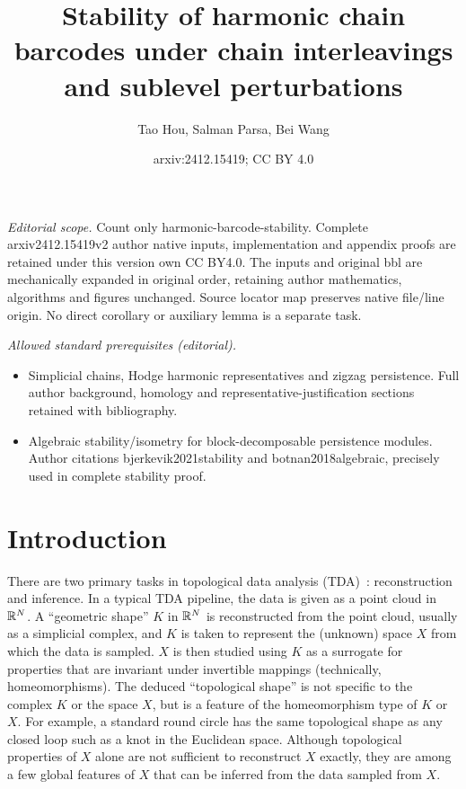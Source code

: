 \documentclass[10pt,a4paper]{amsart}
\title{Stability of harmonic chain barcodes under chain interleavings and sublevel perturbations}
\author{Tao Hou, Salman Parsa, Bei Wang}
\date{arxiv:2412.15419; CC BY 4.0}
\newcommand {\mm}[1] {\ifmmode{#1}\else{\mbox{\(#1\)}}\fi}
\newcommand{\Rspace}        {\mm{\mathbb{R}}}
\theoremstyle{definition}
\theoremstyle{remark}
\begin{document}
\maketitle
\noindent\textit{Editorial scope.} Count only harmonic-barcode-stability. Complete arxiv2412.15419v2 author native inputs, implementation and appendix proofs are retained under this version own CC BY4.0. The inputs and original bbl are mechanically expanded in original order, retaining author mathematics, algorithms and figures unchanged. Source locator map preserves native file/line origin. No direct corollary or auxiliary lemma is a separate task.\par\medskip
\noindent\textit{Allowed standard prerequisites (editorial).}\begin{itemize}
\item Simplicial chains, Hodge harmonic representatives and zigzag persistence. Full author background, homology and representative-justification sections retained with bibliography.
\item Algebraic stability/isometry for block-decomposable persistence modules. Author citations bjerkevik2021stability and botnan2018algebraic, precisely used in complete stability proof.
\end{itemize}\medskip
\section{Introduction}
\label{sec:introduction}

There are two primary tasks in topological data analysis (TDA)~\cite{DeyWang2022,EdelsbrunnerHarer2010,Zomorodian2005}: reconstruction and inference. 
In a typical TDA pipeline, the data is given as a point cloud in $\Rspace^N$.  
A ``geometric shape'' $K$ in $\Rspace^N$ is reconstructed from the point cloud, usually as a simplicial complex, and $K$ is taken to represent the (unknown) space $X$ from which the data is sampled. 
$X$ is then studied using $K$ as a surrogate for properties that are invariant under invertible mappings (technically, homeomorphisms). 
The deduced ``topological shape'' is not specific to the complex $K$ or the space $X$, but is a feature of the homeomorphism type of $K$ or $X$. 
For example, a standard round circle has the same topological shape as any closed loop such as a knot in the Euclidean space. 
Although topological properties of $X$ alone are not sufficient to reconstruct $X$ exactly, they are among a few global features of $X$ that can be inferred from the data sampled from $X$. 
\end{document}
